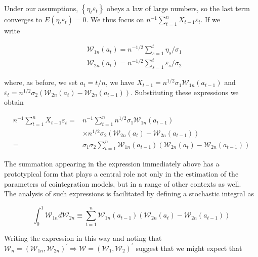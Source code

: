 \documentclass[10pt]{article}
\begin{document}
Under our assumptions, $\left\{\eta_{t} \varepsilon_{t}\right\}$ obeys a law of large numbers, so the last term converges to $E\left(\eta_{t} \varepsilon_{t}\right)=0$. We thus focus on $n^{-1} \sum_{t=1}^{n} X_{t-1} \varepsilon_{t}$. If we\\
write

$$
\begin{aligned}
& \mathcal{W}_{1 n}\left(a_{t}\right)=n^{-1 / 2} \sum_{s=1}^{t} \eta_{s} / \sigma_{1} \\
& \mathcal{W}_{2 n}\left(a_{t}\right)=n^{-1 / 2} \sum_{s=1}^{t} \varepsilon_{s} / \sigma_{2}
\end{aligned}
$$

where, as before, we set $a_{t}=t / n$, we have $X_{t-1}=n^{1 / 2} \sigma_{1} \mathcal{W}_{1 n}\left(a_{t-1}\right)$ and $\varepsilon_{t}=n^{1 / 2} \sigma_{2}\left(\mathcal{W}_{2 n}\left(a_{t}\right)-\mathcal{W}_{2 n}\left(a_{t-1}\right)\right)$. Substituting these expressions we obtain

$$
\begin{aligned}
n^{-1} \sum_{t=1}^{n} X_{t-1} \varepsilon_{t}= & n^{-1} \sum_{t=1}^{n} n^{1 / 2} \sigma_{1} \mathcal{W}_{1 n}\left(a_{t-1}\right) \\
& \times n^{1 / 2} \sigma_{2}\left(\mathcal{W}_{2 n}\left(a_{t}\right)-\mathcal{W}_{2 n}\left(a_{t-1}\right)\right) \\
= & \sigma_{1} \sigma_{2} \sum_{t=1}^{n} \mathcal{W}_{1 n}\left(a_{t-1}\right)\left(\mathcal{W}_{2 n}\left(a_{t}\right)-\mathcal{W}_{2 n}\left(a_{t-1}\right)\right)
\end{aligned}
$$

The summation appearing in the expression immediately above has a prototypical form that plays a central role not only in the estimation of the parameters of cointegration models, but in a range of other contexts as well.\\
The analysis of such expressions is facilitated by defining a stochastic integral as

$$
\int_{0}^{1} \mathcal{W}_{1 n} d \mathcal{W}_{2 n} \equiv \sum_{t=1}^{n} \mathcal{W}_{1 n}\left(a_{t-1}\right)\left(\mathcal{W}_{2 n}\left(a_{t}\right)-\mathcal{W}_{2 n}\left(a_{t-1}\right)\right)
$$

Writing the expression in this way and noting that $\mathcal{W}_{n}=\left(\mathcal{W}_{1 n}, \mathcal{W}_{2 n}\right)^{\prime} \Rightarrow \mathcal{W}=\left(\mathcal{W}_{1}, \mathcal{W}_{2}\right)^{\prime}$ suggest that we might expect that
\end{document}
